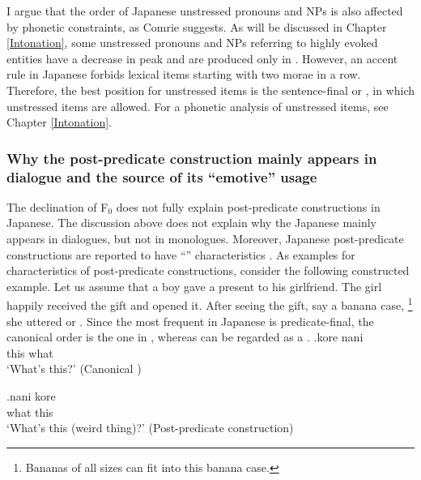 I argue that the order of Japanese unstressed pronouns and NPs is also affected by phonetic constraints, as Comrie suggests.
As will be discussed in Chapter \ref{Intonation}, some unstressed pronouns and NPs referring to highly evoked entities
have a decrease in  peak and are produced only in .
However, an accent rule in Japanese forbids lexical items starting with two  morae in a row.
Therefore, the best position for unstressed items is the sentence-final or ,
in which unstressed items are allowed.
For a phonetic analysis of unstressed items,
see Chapter \ref{Intonation}.


\subsubsection{Why the post-predicate construction mainly appears in dialogue and the source of its ``emotive'' usage}

The declination of F$_{0}$ does not fully explain post-predicate constructions in Jap\-a\-nese. %
The discussion above does not explain why the Japanese  mainly appears in dialogues, but not in monologues.
Moreover, Japanese post-predicate constructions are reported to have ``'' characteristics \cite{ono07}.
As examples for  characteristics of post-predicate constructions, consider the following constructed example.
Let us assume that a boy gave a present to his girlfriend.
The girl happily received the gift and opened it.
After seeing the gift, say a banana case,%
	\footnote{
	Bananas of all sizes can fit into this banana case.
	}
she uttered \Next or \NNext.
Since the most frequent  in Japanese is predicate-final,
the canonical order is the one in \Next  , whereas
\NNext can be regarded as a .
%
\exg.\label{korenani}kore nani \\
	this what \\
	`What's this?'
	\hfill{(Canonical )}

\exg.\label{nanikore}nani kore \\
	what this \\
	`What's this (weird thing)?'
	\hfill{(Post-predicate construction)}

